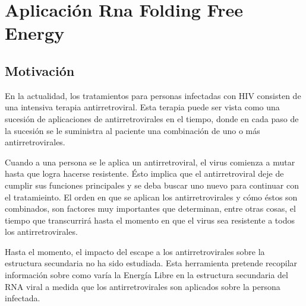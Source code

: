 \chapter{Aplicaci\'on Rna Folding Free Energy}\label{RNAFFE_chapter}
\section{Motivaci\'on}
En la actualidad, los tratamientos para personas infectadas con HIV consisten de una intensiva terapia antirretroviral. Esta terapia puede ser vista como
una sucesi\'on de aplicaciones de antirretrovirales en el tiempo, donde en cada paso de la sucesi\'on se le suministra al paciente una combinaci\'on
de uno o m\'as antirretrovirales.

Cuando a una persona se le aplica un antirretroviral, el virus comienza a mutar hasta que logra hacerse resistente. \'Esto implica que el antirretroviral
deje de cumplir sus funciones principales y se deba buscar uno nuevo para continuar con el tratamieinto. El orden en que se aplican los antirretrovirales
y c\'omo \'estos son combinados, son factores muy importantes que determinan, entre otras cosas, el tiempo que transcurrir\'a hasta el momento en que el
virus sea resistente a todos los antirretrovirales. 

Hasta el momento, el impacto del escape a los antirretrovirales sobre la estructura secundaria no ha sido estudiada. Esta herramienta pretende recopilar
informaci\'on sobre como var\'ia la Energ\'ia Libre en la estructura secundaria del RNA viral a medida que los antirretrovirales son aplicados sobre
la persona infectada.

\newpage

